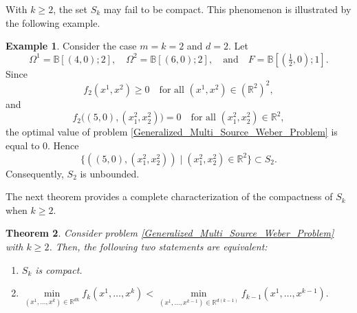 \documentclass[sn-mathphys-num]{sn-jnl}%
\newtheorem{theorem}{Theorem}[section]
\theoremstyle{definition}
\newtheorem{example}[theorem]{Example}
\begin{document}
With $k\geq 2$, the set $S_k$ may fail to be compact. This phenomenon is illustrated by the following example.

\begin{example}
	\label{G.O.Solutions_4}
	Consider the case $m=k=2$ and $d=2$. Let
	\[
	\Omega^1=\mathbb{B}[(4,0);2], \quad
	\Omega^2=\mathbb{B}[(6,0);2], 
	\quad \text{and} \quad
	F=\mathbb{B}\!\left[\left(\tfrac12,0\right);1\right].
	\]
	Since
	\[
	f_2(x^1,x^2)\ge 0
	\quad\text{for all } (x^1,x^2)\in(\mathbb{R}^2)^2,
	\]
	and
	\[
	f_2\big((5,0),(x^2_1,x^2_2)\big)=0
	\quad\text{for all } (x^2_1,x^2_2)\in\mathbb{R}^2,
	\]
	the optimal value of problem
	\eqref{Generalized_Multi_Source_Weber_Problem} is equal to $0$.
	Hence
	\[
	\{((5,0),(x^2_1,x^2_2))\mid (x^2_1,x^2_2)\in\mathbb{R}^2\}
	\subset S_2.
	\]
	Consequently, $S_2$ is unbounded.
\end{example}


The next theorem provides a complete characterization of the compactness of $S_k$ when $k \ge 2$.


\begin{theorem}\label{G.O.Solutions_5} Consider problem \eqref{Generalized_Multi_Source_Weber_Problem} with $k\geq2$.
	Then, the following two statements are equivalent:
	\begin{enumerate}
		\item[{\rm (a)}] $S_k$ is compact.
		\item[{\rm (b)}] $\min\limits_{(x^1,\dots,x^k)\in \mathbb{R}^{dk}} f_k\left(x^1,\dots,x^k \right)
		<
		\min\limits_{(x^1,\dots,x^{k-1})\in \mathbb{R}^{d(k-1)}} f_{k-1}\left(x^1,\dots,x^{k-1} \right).$
	\end{enumerate}
	
\end{theorem}
\end{document}
